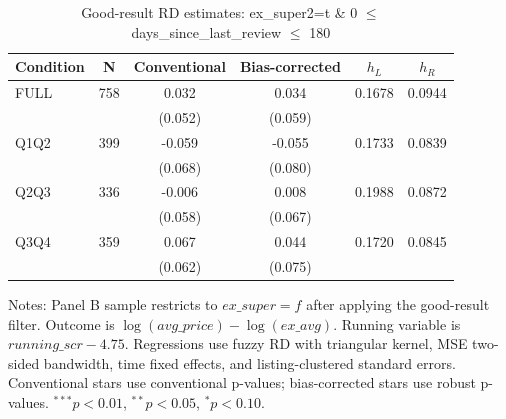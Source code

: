 \begin{table}[!htbp]
\centering
\caption{Good-result RD estimates: ex\_super2=t \& 0 $\leq$ days\_since\_last\_review $\leq$ 180}
\label{tab:good_result_days_since_last_review_180}
\begin{tabular}{lccccc}
\hline
Condition & N & Conventional & Bias-corrected & $h_L$ & $h_R$ \\
\hline
FULL & 758 & 0.032 & 0.034 & 0.1678 & 0.0944 \\
 &  & (0.052) & (0.059) &  &  \\
Q1Q2 & 399 & -0.059 & -0.055 & 0.1733 & 0.0839 \\
 &  & (0.068) & (0.080) &  &  \\
Q2Q3 & 336 & -0.006 & 0.008 & 0.1988 & 0.0872 \\
 &  & (0.058) & (0.067) &  &  \\
Q3Q4 & 359 & 0.067 & 0.044 & 0.1720 & 0.0845 \\
 &  & (0.062) & (0.075) &  &  \\
\hline
\end{tabular}
\begin{flushleft}
\footnotesize Notes: Panel B sample restricts to $ex\_super=f$ after applying the good-result filter. Outcome is $\log(avg\_price)-\log(ex\_avg)$. Running variable is $running\_scr-4.75$. Regressions use fuzzy RD with triangular kernel, MSE two-sided bandwidth, time fixed effects, and listing-clustered standard errors. Conventional stars use conventional p-values; bias-corrected stars use robust p-values. $^{***}p<0.01$, $^{**}p<0.05$, $^{*}p<0.10$.
\end{flushleft}
\end{table}

